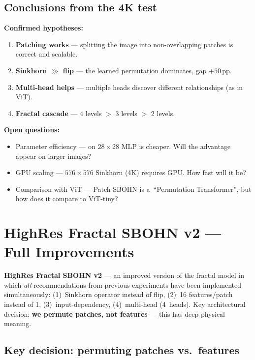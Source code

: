 \documentclass[11pt,a4paper]{report}
\begin{document}
\subsection{Conclusions from the 4K test}

\textbf{Confirmed hypotheses:}
\begin{enumerate}
\item \textbf{Patching works} --- splitting the image into non-overlapping patches is correct and scalable.
\item \textbf{Sinkhorn $\gg$ flip} --- the learned permutation dominates, gap $+50$\,pp.
\item \textbf{Multi-head helps} --- multiple heads discover different relationships (as in ViT).
\item \textbf{Fractal cascade} --- 4 levels $>$ 3 levels $>$ 2 levels.
\end{enumerate}

\textbf{Open questions:}
\begin{itemize}
\item Parameter efficiency --- on $28{\times}28$ MLP is cheaper. Will the advantage appear on larger images?
\item GPU scaling --- $576{\times}576$ Sinkhorn (4K) requires GPU. How fast will it be?
\item Comparison with ViT --- Patch SBOHN is a~``Permutation Transformer'', but how does it compare to ViT-tiny?
\end{itemize}


\section{HighRes Fractal SBOHN v2 --- Full Improvements}\label{sec:fractal_v2}

\begin{tcolorbox}[title=Name: HighRes Fractal SBOHN v2,breakable]
\textbf{HighRes Fractal SBOHN v2} --- an improved version of the fractal model in which
\emph{all} recommendations from previous experiments have been implemented simultaneously:
(1)~Sinkhorn operator instead of flip, (2)~16 features/patch instead of 1, (3)~input-dependency,
(4)~multi-head (4~heads). Key architectural decision: \textbf{we permute patches,
not features} --- this has deep physical meaning.
\end{tcolorbox}

\subsection{Key decision: permuting patches vs.\ features}
\end{document}
